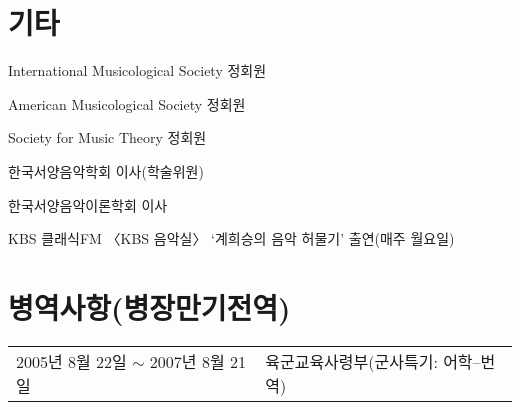 \documentclass[a4paper,10pt,draft]{article}
\begin{document}
  \vspace{2.5mm}
  
  \section*{\normalsize 기타}
  
  
  
  \noindent \hspace{2mm} \textbullet \hspace{2mm} International Musicological Society 정회원
  
  \noindent \hspace{2mm} \textbullet \hspace{2mm} American Musicological Society 정회원
  
  \noindent \hspace{2mm} \textbullet \hspace{2mm} Society for Music Theory 정회원
  
  \noindent \hspace{2mm} \textbullet \hspace{2mm} 한국서양음악학회 이사(학술위원)
  
  \noindent \hspace{2mm} \textbullet \hspace{2mm} 한국서양음악이론학회 이사
  
  \noindent \hspace{2mm} \textbullet \hspace{2mm} KBS 클래식FM 〈KBS 음악실〉 ‘계희승의 음악 허물기’ 출연(매주 월요일)


  \vspace{2.5mm}
  
  \section*{\normalsize 병역사항(병장만기전역)}
  
  \hspace*{-0.25cm}
  \begin{tabular}{p{5.5cm} l}
    2005년 8월 22일 $\sim$ 2007년 8월 21일 & 육군교육사령부(군사특기: 어학--번역)
  \end{tabular}
\end{document}
